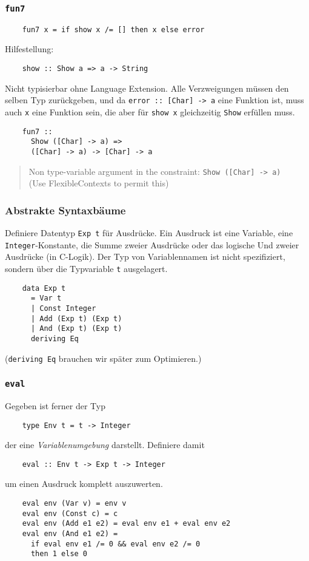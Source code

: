 \documentclass{beamer}
\begin{document}
\begin{frame}[fragile]
  \frametitle{\lstinline{fun7}}
  \begin{lstlisting}
    fun7 x = if show x /= [] then x else error
  \end{lstlisting}
  \pause
  Hilfestellung:
  \begin{lstlisting}
    show :: Show a => a -> String
  \end{lstlisting}
  \pause
  Nicht typisierbar ohne Language Extension.
  Alle Verzweigungen müssen den selben Typ zurückgeben,
  und da \lstinline{error :: [Char] -> a} eine Funktion ist,
  muss auch \lstinline{x} eine Funktion sein,
  die aber für \lstinline{show x} gleichzeitig \lstinline{Show} erfüllen muss.
  \begin{lstlisting}
    fun7 ::
      Show ([Char] -> a) =>
      ([Char] -> a) -> [Char] -> a
  \end{lstlisting}
  \begin{quote}
    Non type-variable argument in the constraint: \lstinline{Show ([Char] -> a)} \\
    (Use FlexibleContexts to permit this)
  \end{quote}
\end{frame}

\begin{frame}[fragile]
  \frametitle{Abstrakte Syntaxbäume}
  Definiere Datentyp \lstinline{Exp t} für Ausdrücke.
  Ein Ausdruck ist eine Variable, eine \lstinline{Integer}-Konstante, die Summe zweier Ausdrücke oder das logische Und zweier Ausdrücke (in C-Logik).
  Der Typ von Variablennamen ist nicht spezifiziert, sondern über die Typvariable \lstinline{t} ausgelagert.
  \pause
  \begin{lstlisting}
    data Exp t
      = Var t
      | Const Integer
      | Add (Exp t) (Exp t)
      | And (Exp t) (Exp t)
      deriving Eq
  \end{lstlisting}
  (\lstinline{deriving Eq} brauchen wir später zum Optimieren.)
\end{frame}

\begin{frame}[fragile]
  \frametitle{\lstinline{eval}}
  Gegeben ist ferner der Typ
  \begin{lstlisting}
    type Env t = t -> Integer
  \end{lstlisting}
  der eine \emph{Variablenumgebung} darstellt.
  Definiere damit
  \begin{lstlisting}
    eval :: Env t -> Exp t -> Integer
  \end{lstlisting}
  um einen Ausdruck komplett auszuwerten.
  \pause
  \begin{lstlisting}
    eval env (Var v) = env v
    eval env (Const c) = c
    eval env (Add e1 e2) = eval env e1 + eval env e2
    eval env (And e1 e2) =
      if eval env e1 /= 0 && eval env e2 /= 0
      then 1 else 0
  \end{lstlisting}
\end{frame}
\end{document}
